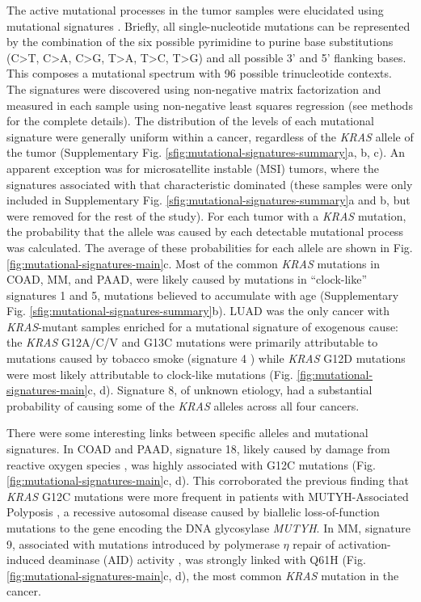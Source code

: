 \documentclass[english, 10pt, letterpaper]{article}
\newcommand{\KRAS}{\emph{KRAS}}
\begin{document}
The active mutational processes in the tumor samples were elucidated using mutational signatures \cite{Alexandrov2013}. 
Briefly, all single-nucleotide mutations can be represented by the combination of the six possible pyrimidine to purine base substitutions (C>T, C>A, C>G, T>A, T>C, T>G) and all possible 3’ and 5’ flanking bases. 
This composes a mutational spectrum with 96 possible trinucleotide contexts. 
The signatures were discovered using non-negative matrix factorization and measured in each sample using non-negative least squares regression (see methods for the complete details). 
The distribution of the levels of each mutational signature were generally uniform within a cancer, regardless of the \KRAS{} allele of the tumor (Supplementary Fig. \ref{sfig:mutational-signatures-summary}a, b, c). 
An apparent exception was for microsatellite instable (MSI) tumors, where the signatures associated with that characteristic dominated (these samples were only included in Supplementary Fig. \ref{sfig:mutational-signatures-summary}a and b, but were removed for the rest of the study). 
For each tumor with a \KRAS{} mutation, the probability that the allele was caused by each detectable mutational process was calculated. 
The average of these probabilities for each allele are shown in Fig. \ref{fig:mutational-signatures-main}c. 
Most of the common \KRAS{} mutations in COAD, MM, and PAAD, were likely caused by mutations in “clock-like” signatures 1 and 5, mutations believed to accumulate with age \cite{Alexandrov2015} (Supplementary Fig. \ref{sfig:mutational-signatures-summary}b). 
LUAD was the only cancer with \KRAS{}-mutant samples enriched for a mutational signature of exogenous cause: the \KRAS{} G12A/C/V and G13C mutations were primarily attributable to mutations caused by tobacco smoke (signature 4 \cite{Alexandrov2016}) while \KRAS{} G12D mutations were most likely attributable to clock-like mutations (Fig. \ref{fig:mutational-signatures-main}c, d).
Signature 8, of unknown etiology, had a substantial probability of causing some of the \KRAS{} alleles across all four cancers.

There were some interesting links between specific alleles and mutational signatures.
In COAD and PAAD, signature 18, likely caused by damage from reactive oxygen species \cite{Viel2017, Pilati2017}, was highly associated with G12C mutations (Fig. \ref{fig:mutational-signatures-main}c, d).
This corroborated the previous finding that \KRAS{} G12C mutations were more frequent in patients with MUTYH-Associated Polyposis \cite{Viel2017}, a recessive autosomal disease caused by biallelic loss-of-function mutations to the gene encoding the DNA glycosylase \emph{MUTYH}.
In MM, signature 9, associated with mutations introduced by polymerase $\eta$ repair of activation-induced deaminase (AID) activity \cite{Alexandrov2013, Rogozin2018DNACancer., Petljak2016UnderstandingCancer.}, was strongly linked with Q61H (Fig. \ref{fig:mutational-signatures-main}c, d), the most common \KRAS{} mutation in the cancer.
\end{document}
